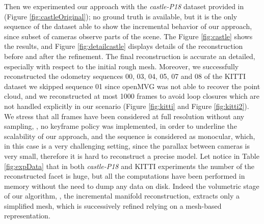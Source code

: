 Then we experimented our approach with the \emph{castle-P18} dataset provided in \cite{strecha2008} (Figure \ref{fig:castleOriginal}); no ground truth is available, but it is the only sequence of the dataset able to show the incremental behavior of our approach, since subset of cameras observe parts of the scene. 
The Figure \ref{fig:castle} shows the results, and Figure \ref{fig:detailcastle} displays details of the reconstruction before and after the refinement. The final reconstruction is accurate  an detailed, especially with respect to the initial rough mesh.
Moreover, we successfully reconstructed the odometry sequences 00, 03, 04, 05, 07 and 08 of the KITTI dataset \cite{geiger_et_al12} we skipped sequence 01 since openMVG was not able to recover the point cloud, and we reconstructed at most 1000 frames to avoid loop closures which are not handled explicitly in our scenario (Figure \ref{fig:kitti} and Figure \ref{fig:kitti2}). We stress that all frames have been considered at full resolution without any sampling, \ie, no keyframe policy was implemented, in order to underline the scalability of our approach, and the sequence is considered as monocular, which, in this case is a very challenging setting, since the parallax between cameras is very small, therefore it is hard to reconstruct a precise model.
Let notice in Table \ref{fig:expData} that in both \emph{castle-P18} and KITTI experiments the number of the reconstructed facet is huge, but all the computations have been performed in memory without the need to dump any data on disk. Indeed the volumetric stage of our algorithm, \ie, the incremental manifold reconstruction, extracts only a  simplified mesh, which is successively refined relying on a mesh-based representation.


